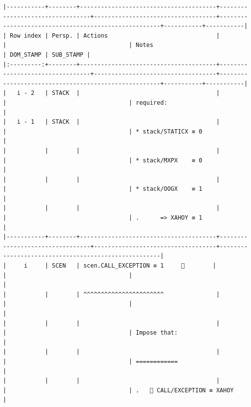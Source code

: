 \documentclass[varwidth=\maxdimen,margin=0.5cm,multi={verbatim}]{standalone}
\begin{document}
\begin{verbatim}
|-----------+--------+---------------------------------------+---------------------------------+-----------------------------------+-----------------------------------------------------+-----------+-----------|
| Row index | Persp. | Actions                               |                                 |                                   | Notes                                               | DOM_STAMP | SUB_STAMP |
|:---------:+--------+---------------------------------------+---------------------------------+-----------------------------------+-----------------------------------------------------+-----------+-----------|
|   i - 2   | STACK  |                                       |                                 |                                   | required:                                           |
|   i - 1   | STACK  |                                       |                                 |                                   | * stack/STATICX ≡ 0                                 |
|           |        |                                       |                                 |                                   | * stack/MXPX    ≡ 0                                 |
|           |        |                                       |                                 |                                   | * stack/OOGX    ≡ 1                                 |
|           |        |                                       |                                 |                                   | .      => XAHOY ≡ 1                                 |
|-----------+--------+---------------------------------------+---------------------------------+-----------------------------------+-----------------------------------------------------|
|     i     | SCEN   | scen.CALL_EXCEPTION ≡ 1     👋        |                                 |                                   |                                                     |
|           |        | ^^^^^^^^^^^^^^^^^^^^^^^               |                                 |                                   |                                                     |
|           |        |                                       |                                 |                                   | Impose that:                                        |
|           |        |                                       |                                 |                                   | ============                                        |
|           |        |                                       |                                 |                                   | .    CALL/EXCEPTION ≡ XAHOY                        |

\end{verbatim}
\end{document}
